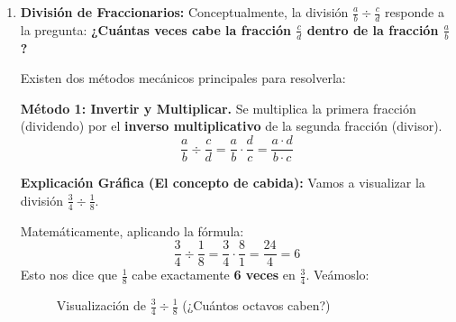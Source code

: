 \begin{enumerate}
    
    \textbf{Recomendación (Simplificación previa):} En la multiplicación es muy útil simplificar cualquier numerador con cualquier denominador \textit{antes} de multiplicar, para evitar trabajar con números muy grandes.
    
    \textbf{Ejemplo con simplificación:} Multiplicar $\frac{4}{9} \cdot \frac{3}{10}$.
    \[ \frac{\textcolor{red}{4}}{\textcolor{blue}{9}} \cdot \frac{\textcolor{blue}{3}}{\textcolor{red}{10}} = \frac{\cancelto{2}{4} \cdot \cancelto{1}{3}}{\cancelto{3}{9} \cdot \cancelto{5}{10}} = \frac{2 \cdot 1}{3 \cdot 5} = \frac{2}{15} \]
    En este caso, simplificamos el 4 con el 10 (sacando mitad) y el 3 con el 9 (sacando tercera).
    
 \item \textbf{División de Fraccionarios:} 
    Conceptualmente, la división $\frac{a}{b} \div \frac{c}{d}$ responde a la pregunta: \textbf{¿Cuántas veces cabe la fracción $\frac{c}{d}$ dentro de la fracción $\frac{a}{b}$?}
    
    Existen dos métodos mecánicos principales para resolverla:
    
    \textbf{Método 1: Invertir y Multiplicar.} Se multiplica la primera fracción (dividendo) por el \textbf{inverso multiplicativo} de la segunda fracción (divisor).
    \begin{equation}
    \boxed{\frac{a}{b} \div \frac{c}{d} = \frac{a}{b} \cdot \frac{d}{c} = \frac{a \cdot d}{b \cdot c}}
    \end{equation}
    
    \textbf{Explicación Gráfica (El concepto de cabida):}
    Vamos a visualizar la división $\frac{3}{4} \div \frac{1}{8}$.
    
    Matemáticamente, aplicando la fórmula:
    \[ \frac{3}{4} \div \frac{1}{8} = \frac{3}{4} \cdot \frac{8}{1} = \frac{24}{4} = 6 \]
    Esto nos dice que $\frac{1}{8}$ cabe exactamente \textbf{6 veces} en $\frac{3}{4}$. Veámoslo:

        \begin{figure}[ht]
    \centering
    \caption{Visualización de $\frac{3}{4} \div \frac{1}{8}$ (¿Cuántos octavos caben?)}\label{fig:divfrac}
\end{figure}
\end{enumerate}
